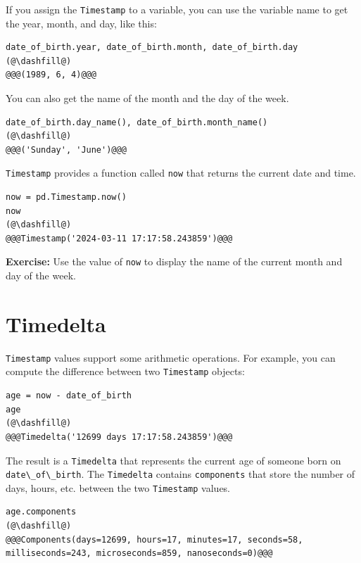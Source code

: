 If you assign the \passthrough{\lstinline!Timestamp!} to a variable, you
can use the variable name to get the year, month, and day, like this:

\begin{lstlisting}[]
date_of_birth.year, date_of_birth.month, date_of_birth.day
(@\dashfill@)
@@@(1989, 6, 4)@@@
\end{lstlisting}

You can also get the name of the month and the day of the week.

\begin{lstlisting}[]
date_of_birth.day_name(), date_of_birth.month_name()
(@\dashfill@)
@@@('Sunday', 'June')@@@
\end{lstlisting}

\passthrough{\lstinline!Timestamp!} provides a function called
\passthrough{\lstinline!now!} that returns the current date and time.

\begin{lstlisting}[]
now = pd.Timestamp.now()
now
(@\dashfill@)
@@@Timestamp('2024-03-11 17:17:58.243859')@@@
\end{lstlisting}

\textbf{Exercise:} Use the value of \passthrough{\lstinline!now!} to
display the name of the current month and day of the week.

\hypertarget{timedelta}{%
\section{Timedelta}\label{timedelta}}

\passthrough{\lstinline!Timestamp!} values support some arithmetic
operations. For example, you can compute the difference between two
\passthrough{\lstinline!Timestamp!} objects:

\begin{lstlisting}[]
age = now - date_of_birth
age
(@\dashfill@)
@@@Timedelta('12699 days 17:17:58.243859')@@@
\end{lstlisting}

The result is a \passthrough{\lstinline!Timedelta!} that represents the
current age of someone born on
\passthrough{\lstinline!date\_of\_birth!}. The
\passthrough{\lstinline!Timedelta!} contains
\passthrough{\lstinline!components!} that store the number of days,
hours, etc. between the two \passthrough{\lstinline!Timestamp!} values.

\begin{lstlisting}[]
age.components
(@\dashfill@)
@@@Components(days=12699, hours=17, minutes=17, seconds=58, milliseconds=243, microseconds=859, nanoseconds=0)@@@
\end{lstlisting}

